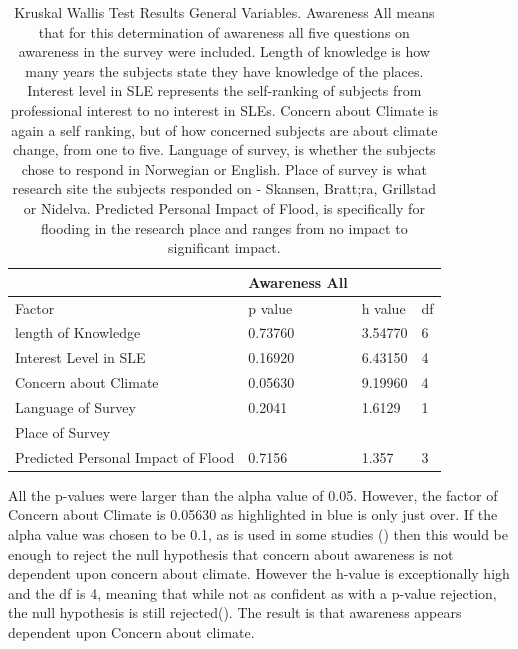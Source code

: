 \begin{table}[H]
    \centering
    \begin{tabular}{|l|l|l|l|}
    \hline
         ~ & \textbf{Awareness All} & ~ & ~ \\ \hline
        Factor & p value & h value & df \\ \hline
           length of Knowledge & 0.73760 & 3.54770 & 6 \\ \hline
       Interest Level in SLE & 0.16920 & 6.43150 & 4 \\ \hline
        Concern about Climate & \cellcolor[HTML]{7df9ff} 0.05630 & \cellcolor[HTML]{7df9ff} 9.19960 & \cellcolor[HTML]{7df9ff} 4 \\ \hline
        Language of Survey & 0.2041 & 1.6129 & 1 \\ \hline
        Place of Survey & & & \\ \hline
        Predicted Personal Impact of Flood & 0.7156 & 1.357 & 3 \\ \hline
    \end{tabular}
    \caption{Kruskal Wallis Test Results General Variables. Awareness All means that for this determination of awareness all five questions on awareness in the survey were included. Length of knowledge is how many years the subjects state they have knowledge of the places. Interest level in SLE represents the self-ranking of subjects from professional interest to no interest in SLEs. Concern about Climate is again a self ranking, but of how concerned subjects are about climate change, from one to five. Language of survey, is whether the subjects chose to respond in Norwegian or English. Place of survey is what research site the subjects responded on - Skansen, Bratt;ra, Grillstad or Nidelva. Predicted Personal Impact of Flood, is specifically for flooding in the research place and ranges from no impact to significant impact. }
    \label{Kruskal_wallis_test_general}
\end{table}

All the p-values were larger than the alpha value of 0.05. However, the factor of Concern about Climate  is 0.05630 as highlighted in blue is only just over.  If the alpha value was chosen to be 0.1, as is used in some studies (\cite{hollander_nonparametric_2014}) then this would be enough to reject the null hypothesis that concern about awareness is not dependent upon concern about climate. However the h-value is exceptionally high and the df is 4, meaning that while not as confident as with a p-value rejection, the null hypothesis is still rejected(\cite{minitab_interpret_2022}). The result is that awareness appears dependent upon Concern about climate. 


